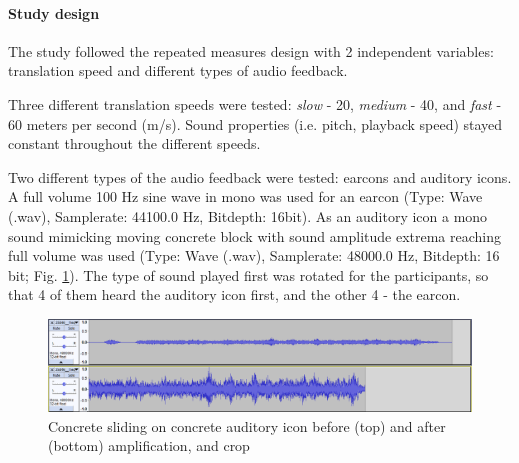 \paragraph{Study design}
The study followed the repeated measures design with 2 independent variables: translation speed and different types of audio feedback.

Three different translation speeds were tested: \textit{slow} - 20, \textit{medium }- 40, and \textit{fast }- 60 meters per second (m/s). Sound properties (i.e. pitch, playback speed) stayed constant throughout the different speeds.

Two different types of the audio feedback were tested: earcons and auditory icons. A full volume 100 Hz sine wave in mono was used for an earcon (Type: Wave (.wav), Samplerate: 44100.0 Hz, Bitdepth: 16bit). As an auditory icon a mono sound mimicking moving concrete block with sound amplitude extrema reaching full volume was used (Type: Wave (.wav), Samplerate: 48000.0 Hz, Bitdepth: 16 bit; Fig. \ref{fig:pilot1concreteonconcretesoundedit}).
The type of sound played first was rotated for the participants, so that 4 of them heard the auditory icon first, and the other 4 - the earcon.

\begin{figure}
	\centering
	\includegraphics[width=0.7\linewidth]{figures/pilot1_concrete_on_concrete_sound_edit}
	\caption{Concrete sliding on concrete auditory icon before (top) and after (bottom) amplification, and crop}
	\label{fig:pilot1concreteonconcretesoundedit}
\end{figure}

